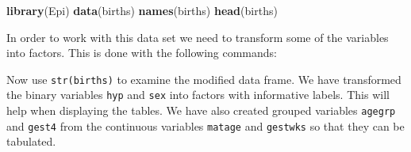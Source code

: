 \documentclass[
]{book}
\newenvironment{Shaded}{\begin{snugshade}}{\end{snugshade}}
\newcommand{\AttributeTok}[1]{\textcolor[rgb]{0.13,0.29,0.53}{#1}}
\newcommand{\ConstantTok}[1]{\textcolor[rgb]{0.56,0.35,0.01}{#1}}
\newcommand{\DecValTok}[1]{\textcolor[rgb]{0.00,0.00,0.81}{#1}}
\newcommand{\FunctionTok}[1]{\textcolor[rgb]{0.13,0.29,0.53}{\textbf{#1}}}
\newcommand{\NormalTok}[1]{#1}
\newcommand{\OtherTok}[1]{\textcolor[rgb]{0.56,0.35,0.01}{#1}}
\newcommand{\SpecialCharTok}[1]{\textcolor[rgb]{0.81,0.36,0.00}{\textbf{#1}}}
\newcommand{\StringTok}[1]{\textcolor[rgb]{0.31,0.60,0.02}{#1}}
\begin{document}
\begin{Shaded}
\begin{Highlighting}[]
\FunctionTok{library}\NormalTok{(Epi)}
\FunctionTok{data}\NormalTok{(births)}
\FunctionTok{names}\NormalTok{(births)}
\FunctionTok{head}\NormalTok{(births)}
\end{Highlighting}
\end{Shaded}

In order to work with this data set we need to transform some of the variables
into factors. This is done with the following commands:

\begin{Shaded}
\end{Shaded}

Now use \texttt{str(births)} to examine the modified data frame. We have
transformed the binary variables \texttt{hyp} and \texttt{sex} into factors
with informative labels. This will help when displaying the tables. We
have also created grouped variables \texttt{agegrp} and \texttt{gest4} from
the continuous variables \texttt{matage} and \texttt{gestwks} so that they
can be tabulated.
\end{document}

